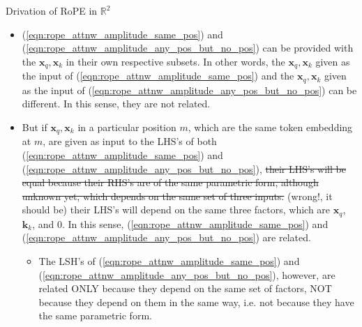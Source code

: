 \documentclass{beamer}
\begin{document}
	\begin{frame}{Drivation of RoPE in $\mathbb{R}^2$}
		\begin{itemize}
			\item (\ref{eqn:rope_attnw_amplitude_same_pos}) and (\ref{eqn:rope_attnw_amplitude_any_pos_but_no_pos}) can be provided with the $\mathbf{x}_q, \mathbf{x}_k$ in their own respective subsets. In other words, the $\mathbf{x}_q, \mathbf{x}_k$ given as the input of (\ref{eqn:rope_attnw_amplitude_same_pos}) and the $\mathbf{x}_q, \mathbf{x}_k$ given as the input of (\ref{eqn:rope_attnw_amplitude_any_pos_but_no_pos}) can be different. In this sense, they are not related. 
			\item But if $\mathbf{x}_q, \mathbf{x}_k$ in a particular position $m$, which are the same token embedding at $m$, are given as input to the LHS's of both (\ref{eqn:rope_attnw_amplitude_same_pos}) and (\ref{eqn:rope_attnw_amplitude_any_pos_but_no_pos}), \sout{their LHS's will be equal because their RHS's are of the same parametric form, although unknown yet, which depends on the same set of three inputs.} (wrong!, it should be) their LHS's will depend on the same three factors, which are $\mathbf{x}_q$, $\mathbf{k}_k$, and $0$. In this sense, (\ref{eqn:rope_attnw_amplitude_same_pos}) and (\ref{eqn:rope_attnw_amplitude_any_pos_but_no_pos}) are related.
			\begin{itemize}
				\item The LSH's of (\ref{eqn:rope_attnw_amplitude_same_pos}) and (\ref{eqn:rope_attnw_amplitude_any_pos_but_no_pos}), however, are related ONLY because they depend on the same set of factors, NOT because they depend on them in the same way, i.e. not because they have the same parametric form.
			\end{itemize}			
		\end{itemize}		
	\end{frame}
	
\end{document}
